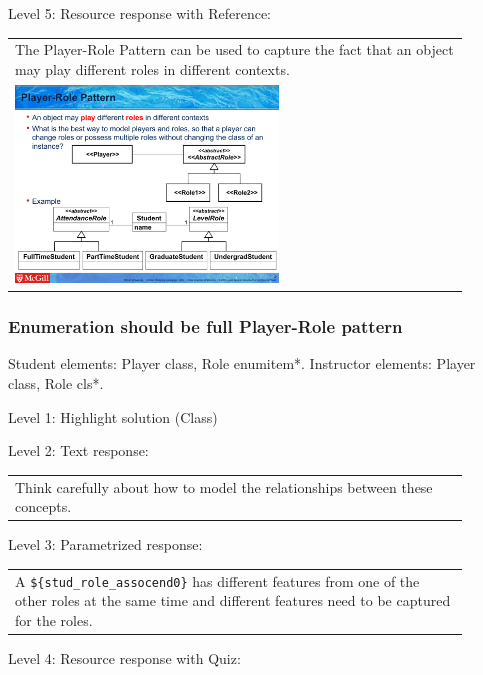 \noindent Level 5: Resource response with Reference: \medskip

\begin{tabular}{|p{0.9\linewidth}}
The Player-Role Pattern can be used to capture the fact that an object may play different roles
in different contexts.

\\
\includegraphics[width=0.6\textwidth]{images/player_role.png}
\end{tabular} \medskip


\subsubsection{Enumeration should be full Player-Role pattern}

Student elements: Player class, Role enumitem*. Instructor elements: Player class, Role cls*. \medskip

\noindent Level 1: Highlight solution (Class) \medskip

\noindent Level 2: Text response: \medskip

\begin{tabular}{|p{0.9\linewidth}}
Think carefully about how to model the relationships between these concepts.
\end{tabular} \medskip

\noindent Level 3: Parametrized response: \medskip

\begin{tabular}{|p{0.9\linewidth}}
A \verb|${stud_role_assocend0}| has different features from one of the other roles at the same time and different features need to be captured for the roles.
\end{tabular} \medskip

\noindent Level 4: Resource response with Quiz: \medskip


